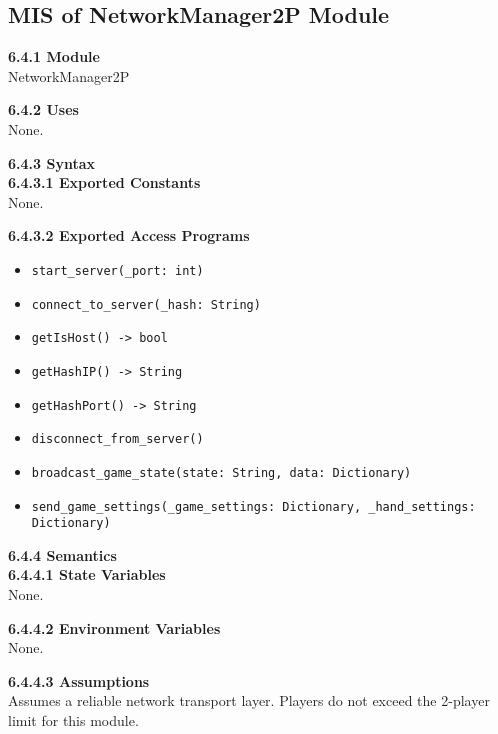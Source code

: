 \documentclass[12pt, titlepage]{article}
\begin{document}
\subsection{MIS of NetworkManager2P Module}\label{NetworkManager2P}
\textbf{6.4.1 Module}\\
NetworkManager2P

\textbf{6.4.2 Uses}\\
None.

\textbf{6.4.3 Syntax}\\
\textbf{6.4.3.1 Exported Constants}\\
None.  

\textbf{6.4.3.2 Exported Access Programs}
\begin{itemize}
    \item \texttt{start\_server(\_port: int)}
    \item \texttt{connect\_to\_server(\_hash: String)}
    \item \texttt{getIsHost() -> bool}
    \item \texttt{getHashIP() -> String}
    \item \texttt{getHashPort() -> String}
    \item \texttt{disconnect\_from\_server()}
    \item \texttt{broadcast\_game\_state(state: String, data: Dictionary)}
    \item \texttt{send\_game\_settings(\_game\_settings: Dictionary, \_hand\_settings: Dictionary)}
\end{itemize}

\textbf{6.4.4 Semantics}\\
\textbf{6.4.4.1 State Variables}\\
None.

\textbf{6.4.4.2 Environment Variables}\\
None.

\textbf{6.4.4.3 Assumptions}\\
Assumes a reliable network transport layer. Players do not exceed the 2-player limit for this module.
\end{document}
